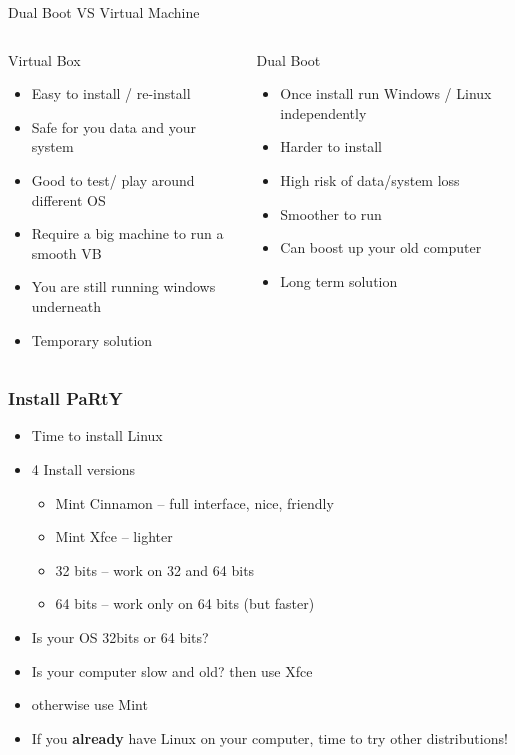 \documentclass{beamer}
\begin{document}
\begin{frame}{Dual Boot VS Virtual Machine}
\begin{columns}
\begin{column}{6cm}
\begin{center}
Virtual Box
\end{center}
\begin{itemize}
\item Easy to install / re-install
\item Safe for you data and your system
\item Good to test/ play around different OS
\item Require a big machine to run a smooth VB
\item You are still running windows underneath
\item Temporary solution
\end{itemize}
\end{column}
\begin{column}{6cm}
\begin{center}
Dual Boot
\end{center}
\begin{itemize}
\item Once install run Windows / Linux independently
\item Harder to install
\item High risk of data/system loss
\item Smoother to run
\item Can boost up your old computer
\item Long term solution
\end{itemize}
\end{column}
\end{columns}
\end{frame}

\begin{frame}
\frametitle{Install PaRtY}
\begin{itemize}
\item Time to install Linux
\item 4 Install versions 
\begin{itemize} 
\item Mint Cinnamon -- full interface, nice, friendly
\item Mint Xfce -- lighter 
\item 32 bits -- work on 32 and 64 bits
\item 64 bits -- work only on 64 bits (but faster)
\end{itemize}
\item Is your OS 32bits or 64 bits? 
\item Is your computer slow and old? then use Xfce
\item otherwise use Mint
\item If you \textbf{already} have Linux on your computer, time to try other distributions!
\end{itemize}
\end{frame}
\end{document}
